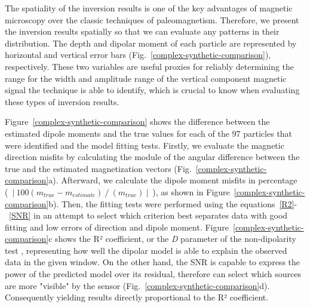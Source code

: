 The spatiality of the inversion results is one of the key advantages of magnetic microscopy over the classic techniques of paleomagnetism. Therefore, we present the inversion results spatially so that we can evaluate any patterns in their distribution. The depth and dipolar moment of each particle are represented by horizontal and vertical error bars (Fig.~\ref{complex-synthetic-comparison}), respectively. These two variables are useful proxies for reliably determining the range for the width and amplitude range of the vertical component magnetic signal the technique is able to identify, which is crucial to know when evaluating these types of inversion results.

Figure~\ref{complex-synthetic-comparison} shows the difference between the estimated dipole moments and the true values for each of the 97 particles that were identified and the model fitting tests. Firstly, we evaluate the magnetic direction misfits by calculating the module of the angular difference between the true and the estimated magnetization vectors (Fig.~\ref{complex-synthetic-comparison}a). Afterward, we calculate the dipole moment misfits in percentage (~$|~100 \left( m_{true} - m_{estimate}\right)~/~\left(m_{true}\right)~|$~), as shown in Figure~\ref{complex-synthetic-comparison}b). Then, the fitting tests were performed using the equations~\ref{R2}-~\ref{SNR} in an attempt to select which criterion best separates data with good fitting and low errors of direction and dipole moment. Figure~\ref{complex-synthetic-comparison}c shows the R² coefficient, or the \emph{D} parameter of the non-dipolarity test \citep{Fu2020}, representing how well the dipolar model is able to explain the observed data in the given window. On the other hand, the SNR is capable to express the power of the predicted model over its residual, therefore can select which sources are more "visible" by the sensor (Fig.~\ref{complex-synthetic-comparison}d). Consequently yielding results directly proportional to the R² coefficient. 



